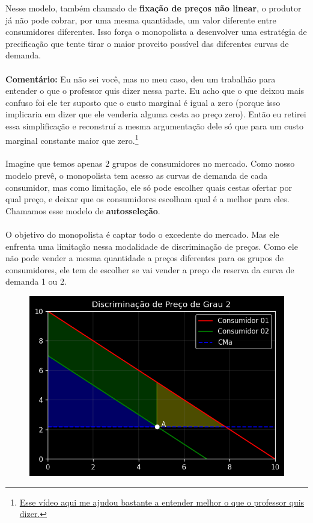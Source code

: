 \documentclass[a4paper,11pt,oneside]{book}
\theoremstyle{definition}
\theoremstyle{break}
\begin{document}
Nesse modelo, também chamado de \textbf{fixação de preços não linear}, o produtor já não pode cobrar, por uma mesma quantidade, um valor diferente entre consumidores diferentes. Isso força o monopolista a desenvolver uma estratégia de precificação que tente tirar o maior proveito possível das diferentes curvas de demanda.
\\
\\
\textbf{Comentário:} Eu não sei você, mas no meu caso, deu um trabalhão para entender o que o professor quis dizer nessa parte. Eu acho que o que deixou mais confuso foi ele ter suposto que o custo marginal é igual a zero (porque isso implicaria em dizer que ele venderia alguma cesta ao preço zero). Então eu retirei essa simplificação e reconstruí a mesma argumentação dele só que para um custo marginal constante maior que zero.\footnote{\href{https://www.youtube.com/watch?v=OBgziVdHH8w}{Esse vídeo aqui me ajudou bastante a entender melhor o que o professor quis dizer.}}
\\
\\
Imagine que temos apenas $2$ grupos de consumidores no mercado. Como nosso modelo prevê, o monopolista tem acesso as curvas de demanda de cada consumidor, mas como limitação, ele só pode escolher quais cestas ofertar por qual preço, e deixar que os consumidores escolham qual é a melhor para eles. Chamamos esse modelo de \textbf{autosseleção}.
\\
\\
O objetivo do monopolista é captar todo o excedente do mercado. Mas ele enfrenta uma limitação nessa modalidade de discriminação de preços. Como ele não pode vender a mesma quantidade a preços diferentes para os grupos de consumidores, ele tem de escolher se vai vender a preço de reserva da curva de demanda 1 ou 2.

\begin{figure}[H]
\centering
\includegraphics[scale=0.8]{cap26_3-discriminacao_grau2_1.png}
\end{figure}
\end{document}
